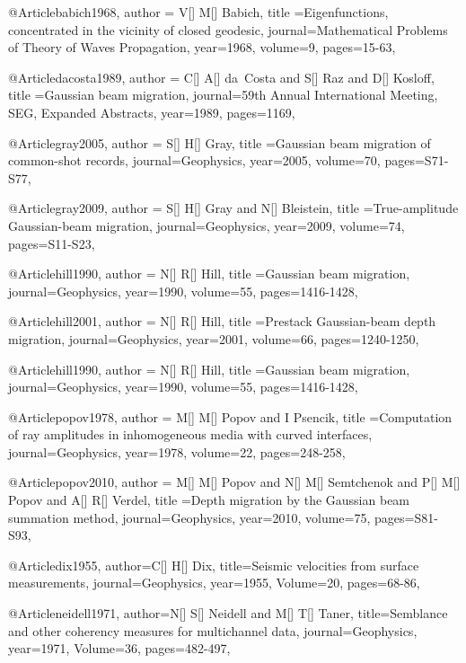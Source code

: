 @Article{babich1968,
  author = {V[] M[] Babich},
  title ={Eigenfunctions, concentrated in the vicinity of closed geodesic},
  journal={Mathematical Problems of Theory of Waves Propagation},
  year=1968,
  volume=9,
  pages={15-63},
}

@Article{dacosta1989,
  author = {C[] A[] da~Costa and S[] Raz and D[] Kosloff},
  title ={Gaussian beam migration},
  journal={59th Annual International Meeting, SEG, Expanded Abstracts},
  year=1989,
  pages={1169},
}



@Article{gray2005,
  author = {S[] H[] Gray},
  title ={Gaussian beam migration of common-shot records},
  journal={Geophysics},
  year=2005,
  volume=70,
  pages={S71-S77},
}

@Article{gray2009,
  author = {S[] H[] Gray and N[] Bleistein},
  title ={True-amplitude Gaussian-beam migration},
  journal={Geophysics},
  year=2009,
  volume=74,
  pages={S11-S23},
}

@Article{hill1990,
  author = {N[] R[] Hill},
  title ={Gaussian beam migration},
  journal={Geophysics},
  year=1990,
  volume=55,
  pages={1416-1428},
}

@Article{hill2001,
  author = {N[] R[] Hill},
  title ={Prestack Gaussian-beam depth migration},
  journal={Geophysics},
  year=2001,
  volume=66,
  pages={1240-1250},
}

@Article{hill1990,
  author = {N[] R[] Hill},
  title ={Gaussian beam migration},
  journal={Geophysics},
  year=1990,
  volume=55,
  pages={1416-1428},
}

@Article{popov1978,
  author = {M[] M[] Popov and I Psencik},
  title ={Computation of ray amplitudes in inhomogeneous media with curved interfaces},
  journal={Geophysics},
  year=1978,
  volume=22,
  pages={248-258},
}

@Article{popov2010,
  author = {M[] M[] Popov and N[] M[] Semtchenok and P[] M[] Popov and A[] R[] Verdel},
  title ={Depth migration by the Gaussian beam summation method},
  journal={Geophysics},
  year=2010,
  volume=75,
  pages={S81-S93},
}

@Article{dix1955,
  author={C[] H[] Dix},
  title={Seismic velocities from surface measurements},
  journal={Geophysics},
  year=1955,
  Volume=20,
  pages={68-86},
}

@Article{neidell1971,
  author={N[] S[] Neidell and M[] T[] Taner},
  title={Semblance and other coherency measures for multichannel data},
  journal={Geophysics},
  year=1971,
  Volume=36,
  pages={482-497},
}

